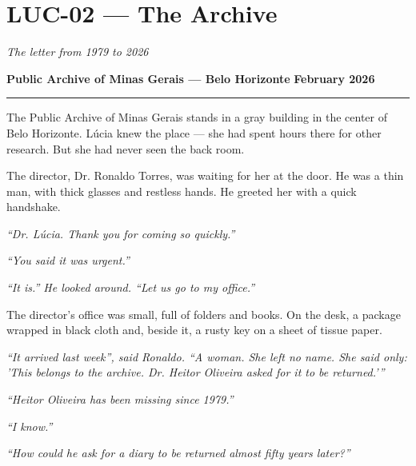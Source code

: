\section*{\textbf{LUC-02} --- The Archive}

\noindent \textit{The letter from 1979 to 2026}

\noindent \textbf{Public Archive of Minas Gerais --- Belo Horizonte}
\textbf{February 2026}

\vspace{0.5em}\noindent\rule{\textwidth}{0.5pt}\vspace{0.5em}

\noindent The Public Archive of Minas Gerais stands in a gray building in the center of Belo Horizonte. Lúcia knew the place --- she had spent hours there for other research. But she had never seen the back room.

\noindent The director, Dr. Ronaldo Torres, was waiting for her at the door. He was a thin man, with thick glasses and restless hands. He greeted her with a quick handshake.

\noindent \textit{\textquotedblleft{}Dr. Lúcia. Thank you for coming so quickly.\textquotedblright{}}

\noindent \textit{\textquotedblleft{}You said it was urgent.\textquotedblright{}}

\noindent \textit{\textquotedblleft{}It is.\textquotedblright{}\textit{ He looked around. }\textquotedblleft{}Let us go to my office.\textquotedblright{}}

\noindent The director's office was small, full of folders and books. On the desk, a package wrapped in black cloth and, beside it, a rusty key on a sheet of tissue paper.

\noindent \textit{\textquotedblleft{}It arrived last week\textquotedblright{}\textit{, said Ronaldo. }\textquotedblleft{}A woman. She left no name. She said only: 'This belongs to the archive. Dr. Heitor Oliveira asked for it to be returned.'\textquotedblright{}}

\noindent \textit{\textquotedblleft{}Heitor Oliveira has been missing since 1979.\textquotedblright{}}

\noindent \textit{\textquotedblleft{}I know.\textquotedblright{}}

\noindent \textit{\textquotedblleft{}How could he ask for a diary to be returned almost fifty years later?\textquotedblright{}}

